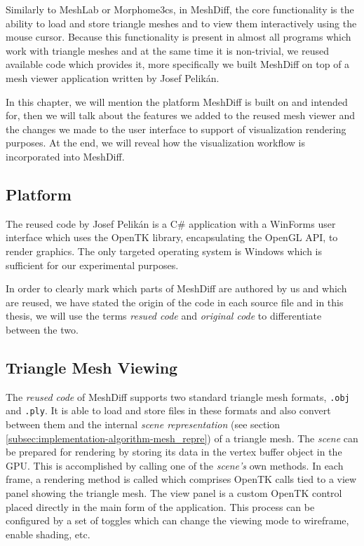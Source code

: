 Similarly to MeshLab or Morphome3cs, in MeshDiff, the core functionality is the ability to load and store triangle meshes and to view them interactively using the mouse cursor. Because this functionality is present in almost all programs which work with triangle meshes and at the same time it is non-trivial, we reused available code which provides it, more specifically we built MeshDiff on top of a mesh viewer application written by Josef Pelikán.

In this chapter, we will mention the platform MeshDiff is built on and intended for, then we will talk about the features we added to the reused mesh viewer and the changes we made to the user interface to support of visualization rendering purposes. At the end, we will reveal how the visualization workflow is incorporated into MeshDiff.

\subsection{Platform}
\label{subsec:implementation-architecture-platform}

The reused code by Josef Pelikán is a C\# application with a WinForms user interface which uses the OpenTK library, encapsulating the OpenGL API, to render graphics. The only targeted operating system is Windows which is sufficient for our experimental purposes.

In order to clearly mark which parts of MeshDiff are authored by us and which are reused, we have stated the origin of the code in each source file and in this thesis, we will use the terms {\it resued code} and {\it original code} to differentiate between the two.

\subsection{Triangle Mesh Viewing}
\label{subsec:implementation-architecture-mesh_viewing}

The {\it reused code} of MeshDiff supports two standard triangle mesh formats, \verb+.obj+ and \verb+.ply+. It is able to load and store files in these formats and also convert between them and the internal {\it scene representation} (see section \ref{subsec:implementation-algorithm-mesh_repre}) of a triangle mesh. The {\it scene} can be prepared for rendering by storing its data in the vertex buffer object in the GPU. This is accomplished by calling one of the {\it scene's} own methods. In each frame, a rendering method is called which comprises OpenTK calls tied to a view panel showing the triangle mesh. The view panel is a custom OpenTK control placed directly in the main form of the application. This process can be configured by a set of toggles which can change the viewing mode to wireframe, enable shading, etc.

